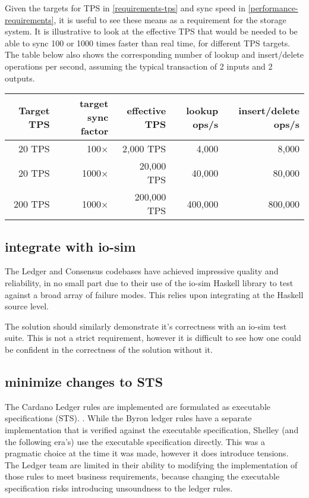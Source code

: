 \documentclass[11pt,a4paper]{article}
\begin{document}
Given the targets for TPS in \cref{requirements-tps} and sync speed in
\cref{performance-requirements}, it is useful to see these means as a
requirement for the storage system. It is illustrative to look at the effective
TPS that would be needed to be able to sync 100 or 1000 times faster than real
time, for different TPS targets. The table below also shows the corresponding
number of {\sc lookup} and {\sc insert}/{\sc delete} operations per second,
assuming the typical transaction of 2 inputs and 2 outputs.
\begin{center}
\begin{tabular}[]{rrrrr}
  Target TPS & target sync factor
             & effective TPS
             & {\sc lookup} ops/s
             & {\sc insert}/{\sc delete} ops/s \\
  \toprule
   20 TPS &   100$\times$ &   2,000 TPS &   4,000 &   8,000 \\
   20 TPS &  1000$\times$ &  20,000 TPS &  40,000 &  80,000 \\
  200 TPS &  1000$\times$ & 200,000 TPS & 400,000 & 800,000
\end{tabular}
\end{center}

\subsection{integrate with io-sim}
\label{io-sim}
The Ledger and Consensus codebases have achieved impressive quality
and reliability, in no small part due to their use of the io-sim
Haskell library to test against a broad array of failure modes. This
relies upon integrating at the Haskell source level.

The solution should similarly demonstrate it's correctness with an io-sim test
suite. This is not a strict requirement, however it is difficult to see how one
could be confident in the correctness of the solution without it.

\subsection{minimize changes to STS}

The Cardano Ledger rules are implemented are formulated as executable
specifications (STS). . While the Byron ledger rules have
a separate implementation that is verified against the executable specification,
Shelley (and the following era's) use the executable specification directly.
This was a pragmatic choice at the time it was made, however it does introduce
tensions. The Ledger team are limited in their ability to modifying the
implementation of those rules to meet business requirements, because changing
the executable specification risks introducing unsoundness to the ledger rules.
\end{document}
